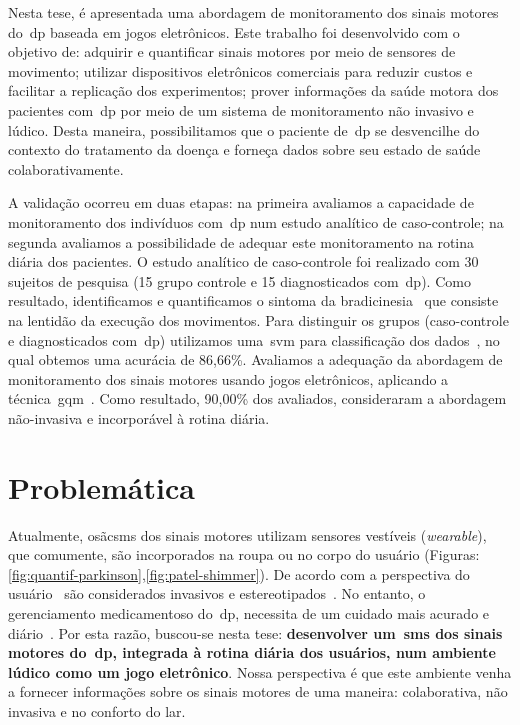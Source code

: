 Nesta tese, é apresentada uma abordagem de monitoramento dos sinais motores do~\ac{dp} baseada em jogos eletrônicos. Este trabalho foi desenvolvido com o objetivo de: adquirir e quantificar sinais motores por meio de sensores de movimento; utilizar dispositivos eletrônicos comerciais para reduzir custos e facilitar a replicação dos experimentos; prover informações da saúde motora dos pacientes com~\ac{dp} por meio de um sistema de monitoramento não invasivo e lúdico. Desta maneira, possibilitamos que o paciente de~\ac{dp} se desvencilhe do contexto do tratamento da doença e forneça dados sobre seu estado de saúde colaborativamente. 

A validação ocorreu em duas etapas: na primeira avaliamos a capacidade de monitoramento dos indivíduos com~\ac{dp} num estudo analítico de caso-controle; na segunda avaliamos a possibilidade de adequar este monitoramento na rotina diária dos pacientes. O estudo analítico de caso-controle foi realizado com 30 sujeitos de pesquisa (15 grupo controle e 15 diagnosticados com~\ac{dp}). Como resultado, identificamos e quantificamos o sintoma da bradicinesia~\cite{protpar010} que consiste na lentidão da execução dos movimentos. Para distinguir os grupos (caso-controle e diagnosticados com~\ac{dp}) utilizamos uma~\ac{svm} para classificação dos dados~\cite{datamining2005}, no qual obtemos uma acurácia de 86,66\%. Avaliamos a adequação da abordagem de monitoramento dos sinais motores usando jogos eletrônicos, aplicando a técnica~\ac{gqm}~\cite{van1999goal}. Como resultado, 90,00\% dos avaliados, consideraram a abordagem não-invasiva e incorporável à rotina diária. 



\section{Problemática}\label{section:problematica}


Atualmente, os\~ac{sms} dos sinais motores utilizam sensores vestíveis (\textit{wearable}), que comumente, são incorporados na roupa ou no corpo do usuário (Figuras: \ref{fig:quantif-parkinson},\ref{fig:patel-shimmer}). De acordo com a perspectiva do usuário~\cite{aarhus_negotiating_2010} são considerados invasivos e estereotipados~\cite{aarhus_negotiating_2010}. No entanto, o gerenciamento medicamentoso do~\ac{dp}, necessita de um cuidado mais acurado e diário~\cite{quantitativeparkinson2011}. Por esta razão, buscou-se nesta tese: \textbf{desenvolver um~\ac{sms} dos sinais motores do~\ac{dp}, integrada à rotina diária dos usuários, num ambiente lúdico como um jogo eletrônico}. Nossa perspectiva é que este ambiente venha a fornecer informações sobre os sinais motores de uma maneira: colaborativa, não invasiva e no conforto do lar. 

